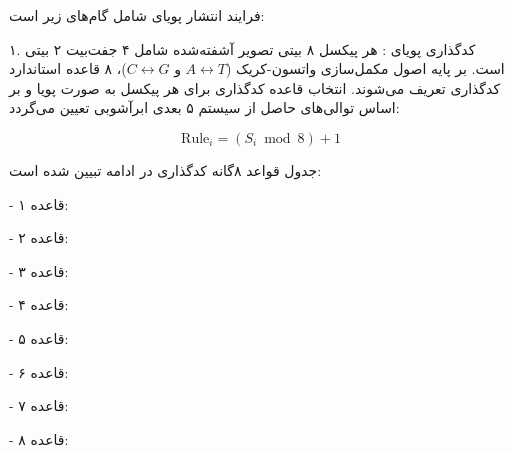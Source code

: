 

فرایند انتشار پویای  شامل گام‌های زیر است:\par

۱. کدگذاری پویای : هر پیکسل ۸ بیتی تصویر آشفته‌شده شامل ۴ جفت‌بیت ۲ بیتی است. بر پایه اصول مكمل‌سازی واتسون{-}کریک ($A \leftrightarrow T$ و $C \leftrightarrow G$)، ۸ قاعده استاندارد کدگذاری  تعریف می‌شوند. انتخاب قاعده کدگذاری برای هر پیکسل به صورت پویا و بر اساس توالی‌های حاصل از سیستم ۵ بعدی ابرآشوبی تعیین می‌گردد:\par



\[\mathrm{Rule}_i = (S_i \bmod 8) + 1\]\par



جدول قواعد ۸گانه کدگذاری  در ادامه تبیین شده است:\par

{-} قاعده ۱: \par

{-} قاعده ۲: \par

{-} قاعده ۳: \par

{-} قاعده ۴: \par

{-} قاعده ۵: \par

{-} قاعده ۶: \par

{-} قاعده ۷: \par

{-} قاعده ۸: \par

